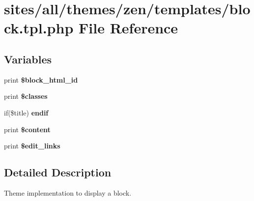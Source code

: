 \hypertarget{sites_2all_2themes_2zen_2templates_2block_8tpl_8php}{
\section{sites/all/themes/zen/templates/block.tpl.php File Reference}
\label{sites_2all_2themes_2zen_2templates_2block_8tpl_8php}
}
\subsection*{Variables}
\begin{CompactItemize}
\item 
\hypertarget{sites_2all_2themes_2zen_2templates_2block_8tpl_8php_1d314df26c9d2df18cfcb1d3b547fba2}{
print \textbf{\$block\_\-html\_\-id}}
\label{sites_2all_2themes_2zen_2templates_2block_8tpl_8php_1d314df26c9d2df18cfcb1d3b547fba2}

\item 
\hypertarget{sites_2all_2themes_2zen_2templates_2block_8tpl_8php_6d48ecbdbc70ca1812e665169b5fa1e2}{
print \textbf{\$classes}}
\label{sites_2all_2themes_2zen_2templates_2block_8tpl_8php_6d48ecbdbc70ca1812e665169b5fa1e2}

\item 
\hypertarget{sites_2all_2themes_2zen_2templates_2block_8tpl_8php_a9240680e3cbd38bd81f4a04400b4b1a}{
if(\$title) \textbf{endif}}
\label{sites_2all_2themes_2zen_2templates_2block_8tpl_8php_a9240680e3cbd38bd81f4a04400b4b1a}

\item 
\hypertarget{sites_2all_2themes_2zen_2templates_2block_8tpl_8php_b7b7210f43aa78e34f0b202de894a74c}{
print \textbf{\$content}}
\label{sites_2all_2themes_2zen_2templates_2block_8tpl_8php_b7b7210f43aa78e34f0b202de894a74c}

\item 
\hypertarget{sites_2all_2themes_2zen_2templates_2block_8tpl_8php_9c32f2aed93e2402d4e45fb55daacb1f}{
print \textbf{\$edit\_\-links}}
\label{sites_2all_2themes_2zen_2templates_2block_8tpl_8php_9c32f2aed93e2402d4e45fb55daacb1f}

\end{CompactItemize}


\subsection{Detailed Description}
Theme implementation to display a block.

